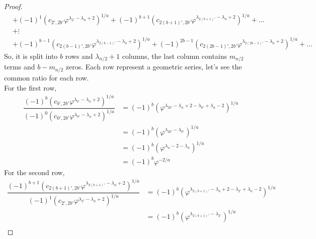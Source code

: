 \documentclass[preprint,12pt]{elsarticle}
\begin{document}
\begin{proof}
\begin{align*}
		     & +(-1)^1(c_{2',2b'}\varphi^{\lambda_{2'}-\lambda_{n}+2})^{1/a}+(-1)^{b+1}(c_{2(b+1)',2b'}\varphi^{\lambda_{2(b+1)'}-\lambda_{n}+2})^{1/a}+\ldots                                                                \\
		     & +\vdots                                                                                                                                                                                                        \\
		     & +(-1)^{b-1}(c_{2(b-1)',2b'}\varphi^{\lambda_{2(b-1)'}-\lambda_{n}+2})^{1/a}+(-1)^{2b-1}(c_{2(2b-1)',2b'}\varphi^{\lambda_{2(2b-1)'}-\lambda_{n}+2})^{1/a}+\ldots                                               
	\end{align*}  
	\clearpage
	So, it is split into $b$ rows and $\lambda_{n/2} + 1$ columns, the last column contains $m_{n/2}$ terms and $b - m_{n/2}$ zeros. Each row represent a geometric series, let's see the common ratio for each row.\\
	For the first row,
	\begin{align*}
		\dfrac{(-1)^{b}(c_{b',2b'}\varphi^{\lambda_{b'}-\lambda_{n}+2})^{1/a}}{(-1)^0(c_{0',2b'}\varphi^{\lambda_{0'}-\lambda_{n}+2})^{1/a}} & = (-1)^b\left(\varphi^{\lambda_{2b'}-\lambda_{n}+2-\lambda_{0'}+\lambda_{n}-2}\right)^{1/a} \\
		                                                                                                                                     & = (-1)^b\left(\varphi^{\lambda_{2b'}-\lambda_{0'}}\right)^{1/a}                             \\
		                                                                                                                                     & = (-1)^b\left(\varphi^{\lambda_{n}-2-\lambda_{n}}\right)^{1/a}                              \\
		                                                                                                                                     & =(-1)^b \varphi^{-2/a}                                                                      
	\end{align*}
	For the second row,
	\begin{align*}
		\dfrac{(-1)^{b+1}(c_{2(b+1)',2b'}\varphi^{\lambda_{2(b+1)'}-\lambda_{n}+2})^{1/a}}{(-1)^{1}(c_{2',2b'}\varphi^{\lambda_{2'}-\lambda_{n}+2})^{1/a}} & = (-1)^b\left(\varphi^{\lambda_{2(b+1)'}-\lambda_{n}+2-\lambda_{2'}+\lambda_{n}-2}\right)^{1/a} \\
		                                                                                                                                                   & = (-1)^b\left(\varphi^{\lambda_{2(b+1)'}-\lambda_{2'}}\right)^{1/a}                             \\

\end{align*}
\end{proof}
\end{document}
